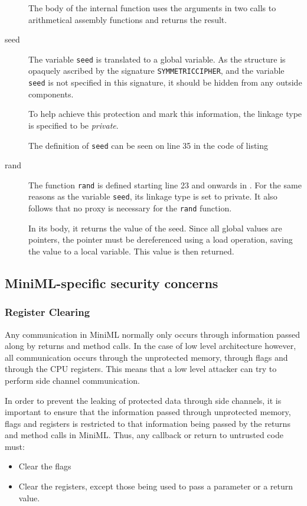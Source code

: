 \documentclass[10pt,a4paper,master=cws, masteroption=ai,english,inputenc=utf8]{kulemt}
\begin{document}
\begin{description}
The body of the internal function uses the arguments in two calls to arithmetical assembly functions and returns the result.
\item[seed] The variable \texttt{seed} is translated to a global variable. As the structure is opaquely ascribed by the signature \texttt{SYMMETRICCIPHER}, and the variable \texttt{seed} is not specified in this signature, it should be hidden from any outside components.

To help achieve this protection and mark this information, the linkage type is specified to be \emph{private}.

The definition of \texttt{seed} can be seen on line 35 in the code of listing~
\item[rand] The function \texttt{rand} is defined starting line 23 and onwards in . For the same reasons as the variable \texttt{seed}, its linkage type is set to private. It also follows that no proxy is necessary for the \texttt{rand} function.

In its body, it returns the value of the seed. Since all global values are pointers, the pointer must be dereferenced using a load operation, saving the value to a local variable. This value is then returned.
\end{description}

\subsection{MiniML-specific security concerns}

\subsubsection{Register Clearing}
Any communication in \mbox{MiniML} normally only occurs through information passed along by returns and method calls.
In the case of low level architecture however, all communication occurs through the unprotected memory, through flags and through the CPU registers.  This means that a low level attacker can try to perform side channel communication.

In order to prevent the leaking of protected data through side channels, it is important to ensure that the information passed through unprotected memory, flags and registers is restricted to that information being passed by the returns and method calls in \mbox{MiniML}.
Thus, any callback or return to untrusted code must:
\begin{itemize}
\item Clear the flags
\item Clear the registers, except those being used to pass a parameter or a return value.
\end{itemize}
\end{document}
